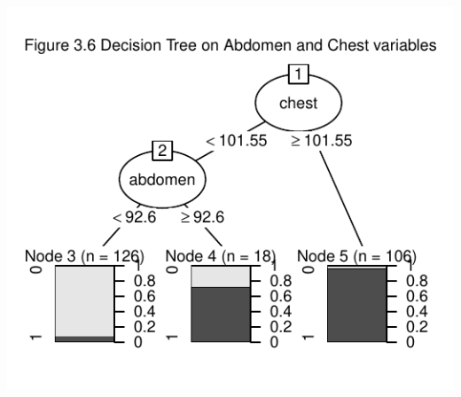 \documentclass[a4paper,9pt,twocolumn,twoside,]{pinp}
\begin{document}
\begin{center}\includegraphics{Executive-Report_files/figure-latex/unnamed-chunk-4-1} \end{center}





\end{document}
